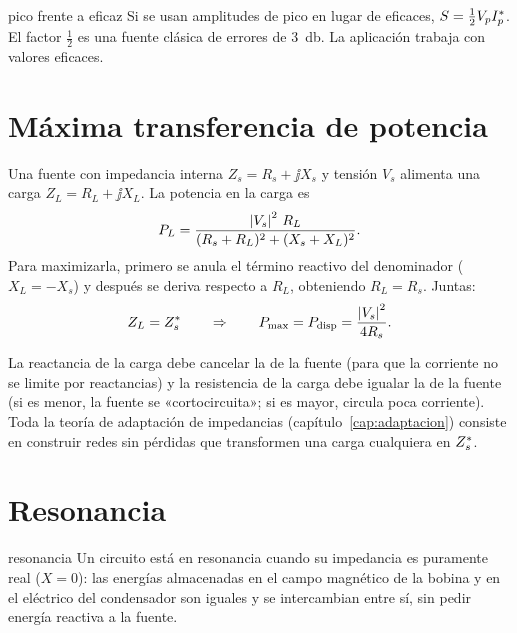 \begin{atencion}{pico frente a eficaz}
Si se usan amplitudes de pico en lugar de eficaces, $S = \tfrac12 V_pI_p^{*}$. El factor $\tfrac12$ es una fuente clásica de
errores de \SI{3}{\decibel}. La aplicación trabaja con valores eficaces.
\end{atencion}

\section{Máxima transferencia de potencia}

Una fuente con impedancia interna $Z_s = R_s + \jj X_s$ y tensión $V_s$ alimenta una carga $Z_L = R_L + \jj X_L$. La potencia en la carga es
\begin{equation}
  P_L = \frac{\left|V_s\right|^2\,R_L}{(R_s + R_L)^2 + (X_s + X_L)^2}.
\end{equation}
Para maximizarla, primero se anula el término reactivo del denominador ($X_L = -X_s$) y después se deriva respecto a $R_L$,
obteniendo $R_L = R_s$. Juntas:
\begin{equation}
  Z_L = Z_s^{*} \qquad\Rightarrow\qquad P_{\max} = P_{\text{disp}} = \frac{\left|V_s\right|^2}{4R_s}.
\end{equation}
\begin{donde}
\end{donde}
\begin{intuicion}
La reactancia de la carga debe cancelar la de la fuente (para que la corriente no se limite por reactancias) y la resistencia de la
carga debe igualar la de la fuente (si es menor, la fuente se «cortocircuita»; si es mayor, circula poca corriente).
Toda la teoría de adaptación de impedancias (capítulo~\ref{cap:adaptacion}) consiste en construir redes sin pérdidas que transformen
una carga cualquiera en $Z_s^{*}$.
\end{intuicion}

\section{Resonancia}

\begin{definicion}{resonancia}
Un circuito está en resonancia cuando su impedancia es puramente real ($X = 0$): las energías almacenadas en el campo magnético
de la bobina y en el eléctrico del condensador son iguales y se intercambian entre sí, sin pedir energía reactiva a la fuente.
\end{definicion}

